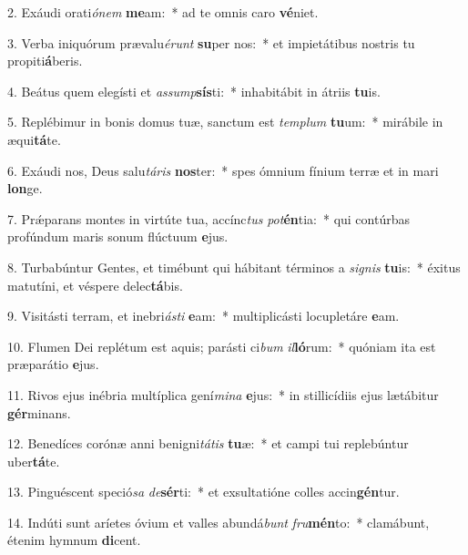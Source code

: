 2. Exáudi orati\textit{ó}\textit{nem} \textbf{me}am:~*  ad te omnis caro \textbf{vé}niet.\

3. Verba iniquórum prævalu\textit{é}\textit{runt} \textbf{su}per nos:~*  et impietátibus nostris tu propiti\textbf{á}beris.\

4. Beátus quem elegísti et \textit{as}\textit{sump}\textbf{sís}ti:~*  inhabitábit in átriis \textbf{tu}is.\

5. Replébimur in bonis domus tuæ, sanctum est \textit{tem}\textit{plum} \textbf{tu}um:~*  mirábile in æqui\textbf{tá}te.\

6. Exáudi nos, Deus salu\textit{tá}\textit{ris} \textbf{nos}ter:~*  spes ómnium fínium terræ et in mari \textbf{lon}ge.\

7. Prǽparans montes in virtúte tua, accínc\textit{tus} \textit{pot}\textbf{én}tia:~*  qui contúrbas profúndum maris sonum flúctuum \textbf{e}jus.\

8. Turbabúntur Gentes, et timébunt qui hábitant términos a \textit{si}\textit{gnis} \textbf{tu}is:~*  éxitus matutíni, et véspere delec\textbf{tá}bis.\

9. Visitásti terram, et inebri\textit{ás}\textit{ti} \textbf{e}am:~*  multiplicásti locupletáre \textbf{e}am.\

10. Flumen Dei replétum est aquis; parásti ci\textit{bum} \textit{il}\textbf{ló}rum:~*  quóniam ita est præparátio \textbf{e}jus.\

11. Rivos ejus inébria multíplica gení\textit{mi}\textit{na} \textbf{e}jus:~*  in stillicídiis ejus lætábitur \textbf{gér}minans.\

12. Benedíces corónæ anni benigni\textit{tá}\textit{tis} \textbf{tu}æ:~*  et campi tui replebúntur uber\textbf{tá}te.\

13. Pinguéscent speció\textit{sa} \textit{de}\textbf{sér}ti:~*  et exsultatióne colles accin\textbf{gén}tur.\

14. Indúti sunt aríetes óvium et valles abundá\textit{bunt} \textit{fru}\textbf{mén}to:~*  clamábunt, étenim hymnum \textbf{di}cent.\

